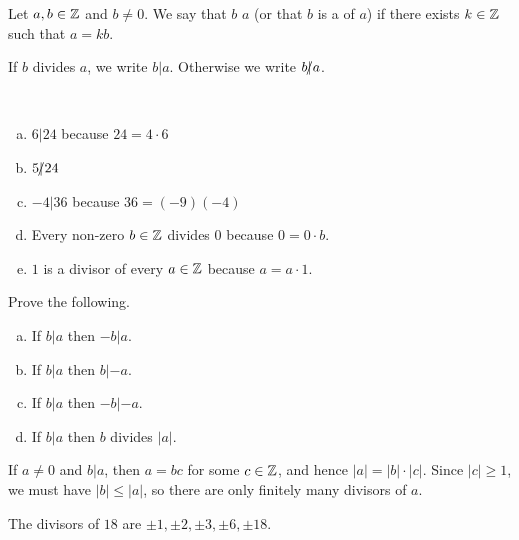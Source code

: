 \documentclass[11pt,fleqn,dvipsnames,usenames]{article}
\begin{document}
\begin{definition} Let $a,b\in\mathbb{Z}$ and $b\neq 0$.  We say that $b$  $a$ (or that $b$ is a  of $a$) if there exists $k\in\mathbb{Z}$ such that $a = kb$.
\end{definition}

\notation If $b$ divides $a$, we write $b | a$.  Otherwise we write $b|\kern-0.9ex{/} a$.
\vsp

\begin{examples}~
\begin{enumerate}[(a)]
\item $6 | 24$ because $24 = 4\cdot 6$
\item $5|\kern-0.9ex{/} 24$
\item $-4 | 36$ because $36 = (-9)(-4)$
\item Every non-zero $b\in\mathbb{Z}$ divides $0$ because $0 = 0\cdot b$.
\item $1$ is a divisor of every $a\in\mathbb{Z}$ because $a = a\cdot 1$.
\end{enumerate}
\end{examples}
%
\begin{exercise} Prove the following.
\begin{enumerate}[(a)]
\item If $b|a$ then $-b|a$.
\item If $b|a$ then $b|-a$.
\item If $b|a$ then $-b|-a$.
\item If $b|a$ then $b$ divides $|a|$.
\end{enumerate}
\end{exercise}

\begin{remark}
If $a\neq 0$ and $b|a$, then $a = bc$ for some $c\in\mathbb{Z}$, and hence $|a| = |b|\cdot |c|$.  Since $|c|\geq 1$, we must have $|b|\leq |a|$, so there are only finitely many divisors of $a$.
\end{remark}

\begin{example}
The divisors of $18$ are $\pm1, \pm2,\pm3,\pm6,\pm18$.
\end{example}
\end{document}
